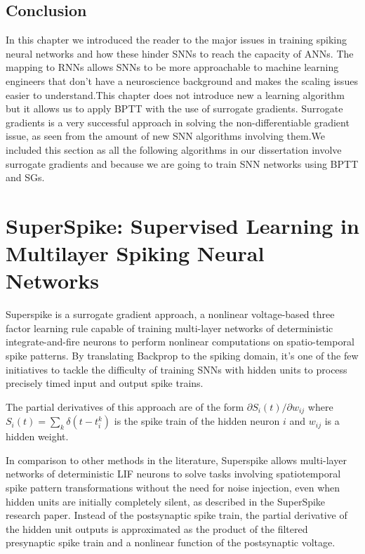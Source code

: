\documentclass[12pt]{report}
\begin{document}
\subsection{Conclusion}
In this chapter we introduced the reader to the major issues in training spiking neural networks and how these hinder SNNs to reach the capacity of ANNs. The mapping to RNNs allows SNNs to be more approachable to machine learning engineers that don't have a neuroscience background and makes the scaling issues easier to understand.This chapter does not introduce new a learning algorithm but it allows us to apply BPTT with the use of surrogate gradients. Surrogate gradients is a very successful approach in solving the non-differentiable gradient issue, as seen from the amount of new SNN algorithms involving them.We included this section as all the following algorithms in our dissertation involve surrogate gradients and because we are going to train SNN networks using BPTT and SGs.
\section{SuperSpike: Supervised Learning in Multilayer Spiking Neural Networks}
Superspike is a surrogate gradient approach, a nonlinear voltage-based three
factor learning rule capable of training multi-layer networks of deterministic integrate-and-fire neurons to perform nonlinear computations on spatio-temporal spike patterns. By translating Backprop to the spiking domain, it's  one of the few initiatives to tackle the difficulty of training SNNs with hidden units to process precisely timed input and output spike trains.

The partial derivatives of this approach are of the form $\partial S_{i}(t) / \partial w_{i j}$ where $S_{i}(t)=\sum_{k} \delta\left(t-t_{i}^{k}\right)$ is the spike train of the hidden neuron $i$ and $w_{i j}$ is a hidden weight.

In comparison to other methods in the literature, Superspike allows multi-layer networks of deterministic LIF neurons to solve tasks involving spatiotemporal spike pattern transformations without the need for noise injection, even when hidden units are initially completely silent, as described in the SuperSpike research paper. Instead of the postsynaptic spike train, the partial derivative of the hidden unit outputs is approximated as the product of the filtered presynaptic spike train and a nonlinear function of the postsynaptic voltage.
\end{document}
